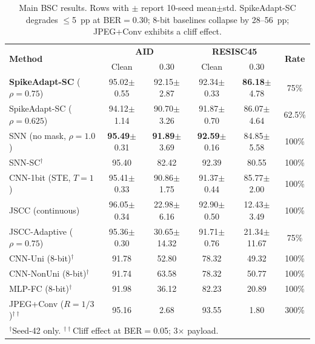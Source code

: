 \documentclass[conference]{IEEEtran}
\begin{document}
\begin{table}[t]
\renewcommand{\arraystretch}{1.12}
\centering
\caption{Main BSC results. Rows with $\pm$ report 10-seed mean$\pm$std. SpikeAdapt-SC degrades $\leq$5~pp at BER$=0.30$; 8-bit baselines collapse by 28--56~pp; JPEG+Conv exhibits a cliff effect.}
\label{tab:main_results}
\setlength{\tabcolsep}{3pt}
\begin{tabular}{l cc cc c}
\toprule
\multirow{2}{*}{\textbf{Method}} & \multicolumn{2}{c}{\textbf{AID}} & \multicolumn{2}{c}{\textbf{RESISC45}} & \multirow{2}{*}{\textbf{Rate}} \\
& Clean & 0.30 & Clean & 0.30 & \\
\midrule
\textbf{SpikeAdapt-SC} ($\rho{=}0.75$) & 95.02{\scriptsize$\pm$0.55} & 92.15{\scriptsize$\pm$2.87} & 92.34{\scriptsize$\pm$0.33} & \textbf{86.18}{\scriptsize$\pm$4.78} & 75\% \\
SpikeAdapt-SC ($\rho{=}0.625$) & 94.12{\scriptsize$\pm$1.14} & 90.70{\scriptsize$\pm$3.26} & 91.87{\scriptsize$\pm$0.70} & 86.07{\scriptsize$\pm$4.64} & 62.5\% \\
SNN (no mask, $\rho{=}1.0$) & \textbf{95.49}{\scriptsize$\pm$0.31} & \textbf{91.89}{\scriptsize$\pm$3.69} & \textbf{92.59}{\scriptsize$\pm$0.16} & 84.85{\scriptsize$\pm$5.58} & 100\% \\
SNN-SC$^\dagger$ & 95.40 & 82.42 & 92.39 & 80.55 & 100\% \\
CNN-1bit (STE, $T{=}1$) & 95.41{\scriptsize$\pm$0.33} & 90.86{\scriptsize$\pm$1.75} & 91.37{\scriptsize$\pm$0.44} & 85.77{\scriptsize$\pm$2.00} & 100\% \\
JSCC (continuous) & 96.05{\scriptsize$\pm$0.34} & 22.98{\scriptsize$\pm$6.16} & 92.90{\scriptsize$\pm$0.50} & 12.43{\scriptsize$\pm$3.49} & 100\% \\
JSCC-Adaptive ($\rho{=}0.75$) & 95.36{\scriptsize$\pm$0.30} & 30.65{\scriptsize$\pm$14.32} & 91.71{\scriptsize$\pm$0.76} & 21.34{\scriptsize$\pm$11.67} & 75\% \\
\midrule
CNN-Uni (8-bit)$^\dagger$ & 91.78 & 52.80 & 78.32 & 49.32 & 100\% \\
CNN-NonUni (8-bit)$^\dagger$ & 91.74 & 63.58 & 78.32 & 50.77 & 100\% \\
MLP-FC (8-bit)$^\dagger$ & 91.98 & 36.12 & 82.23 & 20.89 & 100\% \\
JPEG+Conv ($R{=}1/3$)$^{\dagger\dagger}$ & 95.16 & 2.68 & 93.55 & 1.80 & 300\% \\
\bottomrule
\multicolumn{6}{l}{\scriptsize $^\dagger$Seed-42 only. $^{\dagger\dagger}$Cliff effect at BER$=$0.05; 3$\times$ payload.}
\end{tabular}
\end{table}
\end{document}
